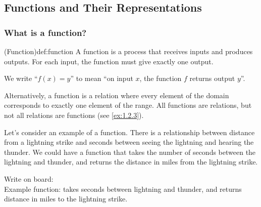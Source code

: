 \documentclass{article}
\begin{document}
\setcounter{section}{1}
\setcounter{subsection}{2}

\subsection{Functions and Their Representations}

\subsubsection{What is a function?}

\begin{definition}{(Function)}{def:function}
    A function is a process that receives inputs and produces outputs. For each input, the function must give exactly one output.

    We write ``$f(x)=y$'' to mean ``on input $x$, the function $f$ returns output $y$''.

    Alternatively, a function is a relation where every element of the domain corresponds to exactly one element of the range. All functions are relations, but not all relations are functions (see \ref{ex:1.2.3}).
\end{definition} 

Let's consider an example of a function. There is a relationship between distance from a lightning strike and seconds between seeing the lightning and hearing the thunder. We could have a function that takes the number of seconds between the lightning and thunder, and returns the distance in miles from the lightning strike.

\begin{directions}
    Write on board:\\
    Example function: takes seconds between lightning and thunder, and returns distance in miles to the lightning strike.
\end{directions}
\end{document}

